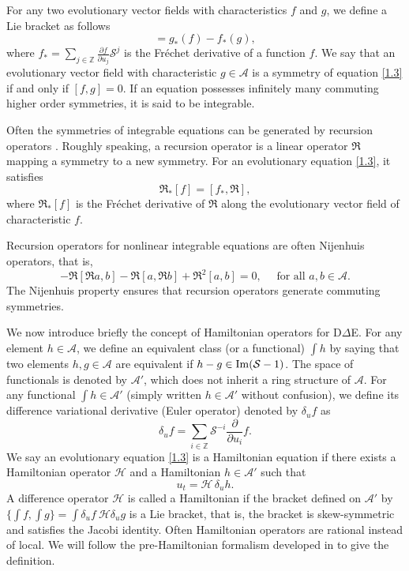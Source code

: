 \documentclass[fleqn,11pt,twoside]{article}
\newcommand\cH{{\mathcal H}}
\newcommand\cS{{\mathcal S}}
\newcommand\cA{{\mathcal A}}
\theoremstyle{definition}
\begin{document}
For any two evolutionary vector fields with characteristics $f$ and $g$, we define a Lie bracket
as follows
\begin{equation*}
		[f,g] = g_*(f)-f_*(g),
		\label{r5}
	\end{equation*}
where $
		f_* = \sum_{j \in \mathbb{Z}} \frac{\partial f}{\partial u_j}
\mathcal{S}^j $
is the Fr\'echet derivative of a function $f$.  We say that an evolutionary vector field with characteristic $g\in \mathcal{A}$ is a symmetry of equation \eqref{1.3}
if and only if $[f, g ] = 0$. If an equation possesses infinitely many commuting higher order symmetries, it is said to be integrable.

Often the symmetries of integrable equations can be generated by recursion operators \cite{55}.
Roughly speaking, a recursion operator is a linear operator $\mathfrak{R}$ mapping a symmetry to
a new symmetry. For an evolutionary equation \eqref{1.3}, it satisfies
	\begin{equation}
		\mathfrak{R}_*[f]=[f_*, \mathfrak{R}],
		\label{1.4}
	\end{equation}
	where $\mathfrak{R}_*[f]$  is the Fr\'echet derivative of $\mathfrak{R}$ along the evolutionary vector field  of characteristic $f$.

Recursion operators for nonlinear integrable equations are often Nijenhuis operators, that is,
\begin{equation}
		[\mathfrak{R} a, \mathfrak{R} b] - \mathfrak{R} [\mathfrak{R} a, b] - \mathfrak{R}[a, \mathfrak{R} b] + \mathfrak{R}^2[a, b] = 0, \quad \mbox{ for all $a, b \in \cA$.}
		\label{Nijen1}
	\end{equation}
The Nijenhuis property ensures that recursion operators generate commuting symmetries.


We now introduce briefly the concept of Hamiltonian operators for D$\Delta$E.
For any element $h \in \mathcal{A}$, we define an equivalent class (or a functional) $\int h$ by
saying that two elements $h, g \in \mathcal{A}$ are equivalent if $h -g \in {\rm Im}(\cS -1)$. The space of functionals
is denoted by $\mathcal{A}'$, which does not inherit a ring structure of $\mathcal{A}$.
For any functional $\int h \in \cA'$ (simply written $h \in \cA'$ without confusion), we define its difference variational derivative (Euler operator) denoted by
$\delta_u f$ as
	\begin{equation*}
		\delta_u f  =\sum_{i \in \mathbb{Z}} \mathcal{S}^{-i}
\frac{\partial }{\partial u_i} f .
	\end{equation*}
We say an evolutionary equation \eqref{1.3} is a
Hamiltonian equation if there exists a Hamiltonian operator $\cH$ and a Hamiltonian $h\in \cA'$ such that
	\begin{equation*}
		u_t = \mathcal{H}\, \delta_u  h .
		\label{Ham1}
	\end{equation*}
A difference operator $\cH$ is called a Hamiltonian if the bracket defined on $\cA'$ by
$\{\int\!\! f, \int\!\! g\}=\int\! \delta_u f\ \cH \delta_u g$ is a Lie bracket, that is, the bracket is skew-symmetric and satisfies the Jacobi identity.
Often Hamiltonian operators are rational instead of local.
We will follow the pre-Hamiltonian formalism developed in \cite{4, 42} to give the definition.
\end{document}
